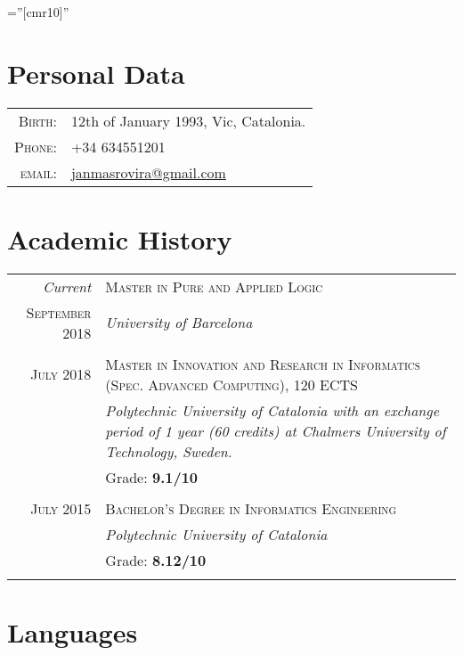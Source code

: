\documentclass[a4paper,10pt]{article}
\begin{document}
\pagestyle{empty}

\font\fb=''[cmr10]''

\par{\bigskip\par}

\section{Personal Data}

\begin{tabular}{rl}
\textsc{Birth:} & 12th of January 1993, Vic, Catalonia.\\
\textsc{Phone:} & +34 634551201\\
\textsc{email:} & \href{mailto:janmasrovira@gmail.com}{janmasrovira@gmail.com}
\end{tabular}

\section{Academic History}

\begin{tabular}{r|p{11cm}}
\emph{Current} & \textsc{Master in Pure and Applied Logic} \\
\textsc{September 2018} & \emph{University of Barcelona}\\
\multicolumn{2}{c}{} \\

  \textsc{July 2018} & \textsc{Master in Innovation and Research in Informatics (Spec. Advanced Computing), 120 ECTS} \\
               & \emph{Polytechnic University of Catalonia with an exchange period of 1 year (60 credits) at Chalmers University of Technology, Sweden.}\\
  & Grade: \textbf{9.1/10} \\
  \multicolumn{2}{c}{} \\

  \textsc{July 2015} & \textsc{Bachelor's Degree in Informatics Engineering} \\
               & \emph{Polytechnic University of Catalonia}\\
               & Grade: \textbf{8.12/10} \\
  \multicolumn{2}{c}{} \\
\end{tabular}

\section{Languages}
\end{document}
